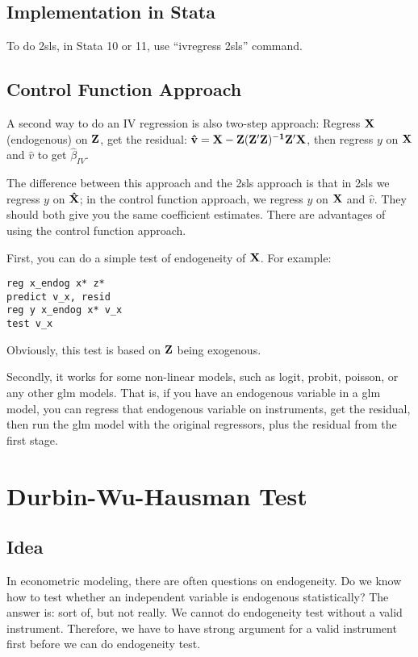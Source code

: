 \subsection{Implementation in Stata}

To do 2sls, in Stata 10 or 11, use ``ivregress 2sls'' command.  

\subsection{Control Function Approach}

A second way to do an IV regression is also two-step approach: Regress
$\bf X$ (endogenous) on $\bf Z$, get the residual: $\bf \hat
v=X-Z(Z'Z)^{-1}Z'X$, then regress $y$ on $\bf X$ and $\hat v$ to get
$\hat \beta_{IV}$.

The difference between this approach and the 2sls approach is that in
2sls we regress $y$ on $\bf \hat X$; in the control function approach,
we regress $y$ on $\bf  X$ and $\hat v$.  They should both give you
the same coefficient estimates.  There are advantages of using the
control function approach.

First, you can do a simple test of endogeneity of $\bf X$.  For
example:

\begin{verbatim}
reg x_endog x* z*
predict v_x, resid
reg y x_endog x* v_x
test v_x
\end{verbatim}

Obviously, this test is based on $\bf Z$ being exogenous.

Secondly, it works for some non-linear models, such as logit, probit,
poisson, or any other glm models.  That is, if you have an endogenous
variable in a glm model, you can regress that endogenous variable on
instruments, get the residual, then run the glm model with the
original regressors, plus the residual from the first stage.

\section{Durbin-Wu-Hausman Test}

\subsection{Idea}

In econometric modeling, there are often questions on endogeneity.  Do
we know how to test whether an independent variable is endogenous
statistically?  The answer is: sort of, but not really.  We cannot do
endogeneity test without a valid instrument.  Therefore, we have to
have strong argument for a valid instrument first before we can do
endogeneity test.


